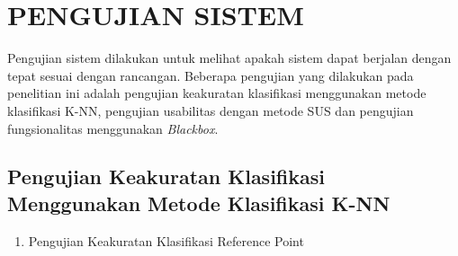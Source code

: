 \begin{enumerate}[a.]
\begin{enumerate}[a.]
\end{enumerate}

\section{\uppercase{PENGUJIAN SISTEM}}
\par Pengujian sistem dilakukan untuk melihat apakah sistem dapat berjalan dengan tepat sesuai dengan rancangan. Beberapa pengujian yang dilakukan pada penelitian ini adalah pengujian keakuratan klasifikasi menggunakan metode klasifikasi K-NN, pengujian usabilitas dengan metode SUS dan pengujian fungsionalitas menggunakan \textit{Blackbox}.

\subsection{Pengujian Keakuratan Klasifikasi Menggunakan Metode Klasifikasi K-NN}
\begin{enumerate}

	\item Pengujian Keakuratan Klasifikasi Reference Point


\end{enumerate}
\end{enumerate}
